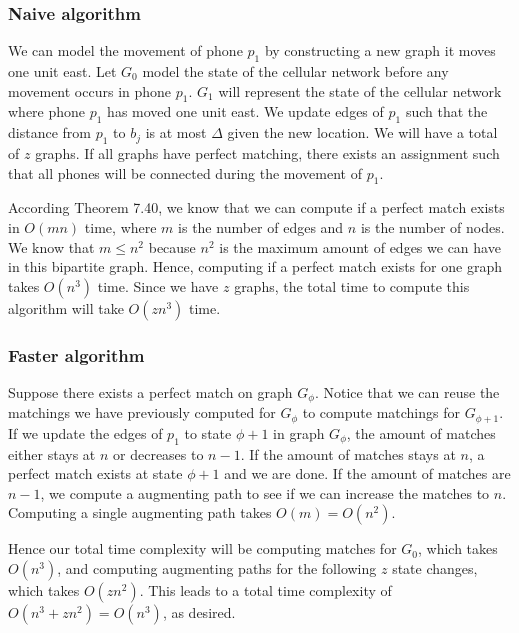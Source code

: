 \documentclass[11pt]{scrartcl}
\begin{document}
\subsubsection{
	Naive algorithm
}

We can model the movement of phone $p_1$ by constructing a new graph it moves one unit east.
Let $G_0$ model the state of the cellular network before any movement occurs in phone $p_1$.
$G_1$ will represent the state of the cellular network where phone $p_1$ has moved one unit east.
We update edges of $p_1$ such that the distance from $p_1$ to $b_j$ is at most $\Delta$ given the
new location. We will have a total of $z$ graphs. If all graphs have perfect matching, there exists
an assignment such that all phones will be connected during the movement of $p_1$.

According Theorem 7.40, we know that we can compute if a perfect match exists in $O(mn)$ time, where $m$ is the
number of edges and $n$ is the number of nodes. We know that $m \leq n^2$ because $n^2$ is the maximum
amount of edges we can have in this bipartite graph. Hence, computing if a perfect match exists for one graph
takes $O(n^3)$ time. Since we have $z$ graphs, the total time to compute this algorithm will take $O(zn^3)$ time.

\subsubsection{
	Faster algorithm
}

Suppose there exists a perfect match on graph $G_\phi$.
Notice that we can reuse the matchings we have previously computed for $G_{\phi}$ to compute
matchings for $G_{\phi+1}$. If we update the edges of $p_1$ to state $\phi +1$ in graph $G_{\phi}$,
the amount of matches either stays at $n$ or decreases to $n-1$. If the amount of matches stays at $n$,
a perfect match exists at state $\phi + 1$ and we are done. If the amount of matches are $n-1$, we
compute a augmenting path to see if we can increase the matches to $n$. Computing a single
augmenting path takes $O(m) = O(n^2)$.

Hence our total time complexity will be computing matches for $G_0$, which takes $O(n^3)$,
and computing augmenting paths for the following $z$ state changes, which takes $O(zn^2)$.
This leads to a total time complexity of $O(n^3 + zn^2) = O(n^3)$, as desired.
\end{document}
